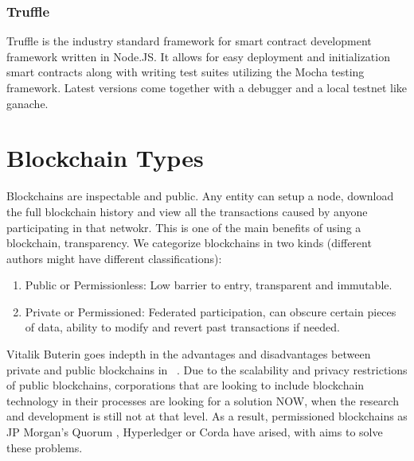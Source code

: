 \subsubsection{Truffle}
Truffle is the industry standard framework for smart contract development framework written in Node.JS. It allows for easy deployment and initialization smart contracts along with writing test suites utilizing the Mocha testing framework. Latest versions come together with a debugger and a local testnet like ganache. 

\section{Blockchain Types}
Blockchains are inspectable and public. Any entity can setup a node, download the full blockchain history and view all the transactions caused by anyone participating in that netwokr. This is one of the main benefits of using a blockchain, transparency.
We categorize blockchains in two kinds (different authors might have different classifications):
\begin{enumerate}
    \item Public or Permissionless: Low barrier to entry, transparent and immutable.
    \item Private or Permissioned: Federated participation, can obscure certain pieces of data, ability to modify and revert past transactions if needed.
\end{enumerate}

Vitalik Buterin goes indepth in the advantages and disadvantages between private and public blockchains in ~\cite{publicprivate}. Due to the scalability and privacy restrictions of public blockchains, corporations that are looking to include blockchain technology in their processes are looking for a solution NOW, when the research and development is still not at that level. As a result, permissioned blockchains as JP Morgan's Quorum \cite{quorum}, Hyperledger or Corda have arised, with aims to solve these problems.
